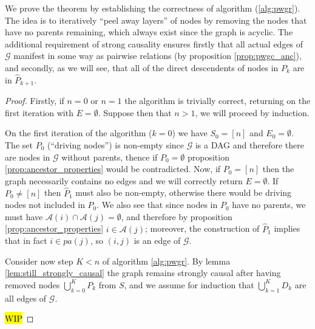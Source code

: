 \documentclass[12pt]{article}
\def\gcg{\mathcal{G}}  %
\newcommand{\pa}[1]{pa(#1)}  %
\newcommand{\anc}[1]{\mathcal{A}(#1)}  %
\begin{document}
We prove the theorem by establishing the correctness of algorithm (\ref{alg:pwgr}).  The idea is to iteratively ``peel away layers'' of nodes by removing the nodes that have no parents remaining, which always exist since the graph is acyclic.  The additional requirement of strong causality ensures firstly that all actual edges of $\gcg$ manifest in some way as pairwise relations (by proposition \ref{prop:pwgc_anc}), and secondly, as we will see, that all of the direct descendents of nodes in $P_k$ are in $\widehat{P}_{k + 1}$.
\begin{proof}

  Firstly, if $n = 0$ or $n = 1$ the algorithm is trivially correct, returning on the first iteration with $E = \emptyset$.  Suppose then that $n > 1$, we will proceed by induction.

  On the first iteration of the algorithm ($k = 0$) we have $S_0 = [n]$ and $E_0 = \emptyset$.  The set $P_0$ (``driving nodes'') is non-empty since $\gcg$ is a DAG and therefore there are nodes in $\gcg$ without parents, thence if $P_0 = \emptyset$ proposition \ref{prop:ancestor_properties} would be contradicted.  Now, if $P_0 = [n]$ then the graph necessarily contains no edges and we will correctly return $E = \emptyset$.  If $P_0 \ne [n]$ then $\widehat{P}_1$ must also be non-empty, otherwise there would be driving nodes not included in $P_0$.  We also see that since nodes in $P_0$ have no parents, we must have $\anc{i}\cap\anc{j} = \emptyset$, and therefore by proposition \ref{prop:ancestor_properties} $i \in \anc{j}$;  moreover, the construction of $\widehat{P}_1$ implies that in fact $i \in \pa{j}$, so $(i, j)$ is an edge of $\gcg$.


Consider now step $K < n$ of algorithm \ref{alg:pwgr}.  By lemma \ref{lem:still_strongly_causal} the graph remains strongly causal after having removed nodes $\bigcup_{k = 0}^K P_k$ from $S$, and we assume for induction that $\bigcup_{k = 1}^K D_k$ are all edges of $\gcg$.

\hl{WIP}
\end{proof}
\end{document}
